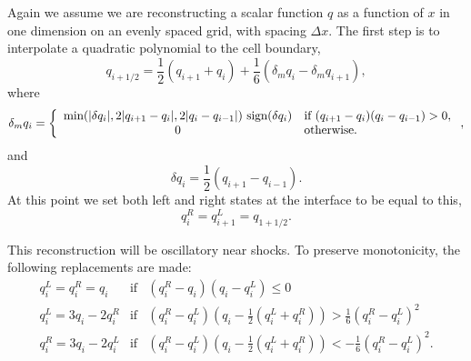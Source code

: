 \documentclass{article}
\begin{document}
Again we assume we are reconstructing a scalar function $q$ as a
function of $x$ in one dimension on an evenly spaced grid, with spacing $\Delta
x$. The first step is to interpolate a quadratic polynomial to the cell
boundary, 
\begin{equation}
  \label{eq:ppm1}
  q_{i+1/2} = \frac{1}{2} \left( q_{i+1} + q_i \right) + \frac{1}{6}
  \left( \delta_m q_i - \delta_m q_{i+1} \right), 
\end{equation}
where
\begin{equation}
  \label{eq:ppmdm1}
  \delta_m q_i = \left\{ \begin{array}{c l} \textrm{min}(|\delta q_i|,
      2|q_{i+1} - q_i|, 2|q_i - q_{i-1}|) \textrm{ sign}(\delta q_i) &
      \textrm{if } (q_{i+1} - q_i)(q_i - q_{i-1}) > 0, \\
      0 & \textrm{otherwise}. \end{array} \right.,
\end{equation}
and
\begin{equation}
  \label{eq:ppmd1}
  \delta q_i = \frac{1}{2}(q_{i+1} - q_{i-1}).
\end{equation}
At this point we set both left and right states at the interface to be
equal to this,
\begin{equation}
  \label{eq:ppmset1}
  q_i^R = q_{i+1}^L = q_{1+1/2}.
\end{equation}

This reconstruction will be oscillatory near shocks. To preserve
monotonicity, the following replacements are made:
\begin{eqnarray}
  \label{eq:ppmmonot}
  q_i^L = q_i^R = q_i & \textrm{if} & (q_i^R - q_i)(q_i - q_i^L) \leq
  0 \\
  q_i^L = 3 q_i - 2q_i^R & \textrm{if} & (q_i^R - q_i^L)\left( q_i -
  \frac{1}{2} (q_i^L + q_i^R) \right) > \frac{1}{6}(q_i^R - q_i^L)^2
  \\ 
  q_i^R = 3 q_i - 2q_i^L & \textrm{if} & (q_i^R - q_i^L)\left( q_i -
  \frac{1}{2} (q_i^L + q_i^R) \right) < -\frac{1}{6}(q_i^R -
  q_i^L)^2. 
\end{eqnarray}
\end{document}
